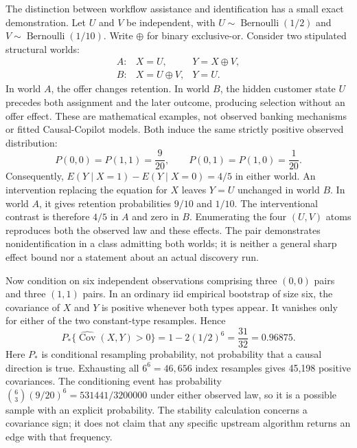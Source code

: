 The distinction between workflow assistance and identification has a small
exact demonstration. Let $U$ and $V$ be independent, with
$U\sim\operatorname{Bernoulli}(1/2)$ and
$V\sim\operatorname{Bernoulli}(1/10)$. Write $\oplus$ for binary exclusive-or.
Consider two stipulated structural worlds:
\begin{equation}
 \begin{array}{lll}
 A:& X=U,&Y=X\oplus V,\\
 B:& X=U\oplus V,&Y=U.
 \end{array}
 \label{exec17:copilot-worlds}
\end{equation}
In world $A$, the offer changes retention. In world $B$, the hidden customer
state $U$ precedes both assignment and the later outcome, producing selection
without an offer effect. These are mathematical examples, not observed banking
mechanisms or fitted Causal-Copilot models. Both induce the same strictly
positive observed distribution:
\begin{equation}
 P(0,0)=P(1,1)=\frac9{20},\qquad
 P(0,1)=P(1,0)=\frac1{20}.
 \label{exec17:copilot-observed}
\end{equation}
Consequently, $E(Y\mid X=1)-E(Y\mid X=0)=4/5$ in either world.
An intervention replacing the equation for $X$ leaves $Y=U$ unchanged in
world $B$. In world $A$, it gives retention probabilities $9/10$ and $1/10$.
The interventional contrast is therefore $4/5$ in $A$ and zero in $B$.
Enumerating the four $(U,V)$ atoms reproduces both the observed law and these
effects. The pair demonstrates nonidentification in a class admitting both
worlds; it is neither a general sharp effect bound nor a statement about an
actual discovery run.\citep{exec17_copilot_exact}

Now condition on six independent observations comprising three $(0,0)$ pairs
and three $(1,1)$ pairs. In an ordinary iid empirical bootstrap of size six,
the covariance of $X$ and $Y$ is positive whenever both types appear.
It vanishes only for either of the two constant-type resamples. Hence
\begin{equation}
 P_*\{\widehat{\operatorname{Cov}}(X,Y)>0\}
 =1-2(1/2)^6=\frac{31}{32}=0.96875.
 \label{exec17:copilot-stability}
\end{equation}
Here $P_*$ is conditional resampling probability, not probability that a causal
direction is true. Exhausting all $6^6=46{,}656$ index resamples gives 45,198
positive covariances. The conditioning event has probability
$\binom63(9/20)^6=531441/3200000$ under either observed law, so it is a possible
sample with an explicit probability. The stability calculation concerns a
covariance sign; it does not claim that any specific upstream algorithm returns
an edge with that frequency.\citep{exec17_copilot_exact}

